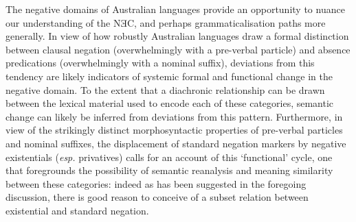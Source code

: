 %
%
%


The negative domains of Australian languages provide an opportunity to nuance our understanding of the NƎC, and perhaps grammaticalisation paths more generally. In view of how robustly Australian languages draw a formal distinction between clausal negation (overwhelmingly with a pre-verbal particle) and absence predications (overwhelmingly with a nominal suffix), deviations from this tendency are likely indicators of systemic formal and functional change in the negative domain. To the extent that a diachronic relationship can be drawn between the lexical material used to encode each of these categories, semantic change can likely be inferred from deviations from this pattern. Furthermore, in view of the strikingly distinct morphosyntactic properties of pre-verbal particles and nominal suffixes, the displacement of standard negation markers by negative existentials (\textit{esp.} privatives) calls for an account of this `functional' cycle, one that foregrounds the possibility of semantic reanalysis and meaning similarity between these categories: indeed as has been suggested in the foregoing discussion, there is good reason to conceive of a subset relation between existential and standard negation. 


